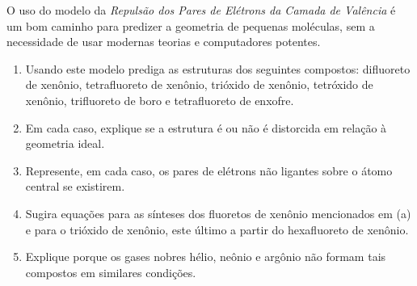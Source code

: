 O uso do modelo da \textit{Repulsão dos Pares de Elétrons da Camada de Valência} é um bom caminho para predizer a geometria de pequenas moléculas, sem a necessidade de usar modernas teorias e computadores potentes.

\begin{enumerate}[label = (\scalealph{\alph*})]
	\item Usando este modelo prediga as estruturas dos seguintes compostos: difluoreto de xenônio, tetrafluoreto de xenônio, trióxido de xenônio, tetróxido de xenônio, trifluoreto de boro e tetrafluoreto de enxofre.
	\item Em cada caso, explique se a estrutura é ou não é distorcida em relação à geometria ideal.
	\item Represente, em cada caso, os pares de elétrons não ligantes sobre o átomo central se existirem.
	\item Sugira equações para as sínteses dos fluoretos de xenônio mencionados em (a) e para o trióxido de xenônio, este último a partir do hexafluoreto de xenônio.
	\item Explique porque os gases nobres hélio, neônio e argônio não formam tais compostos em similares condições.
\end{enumerate}
